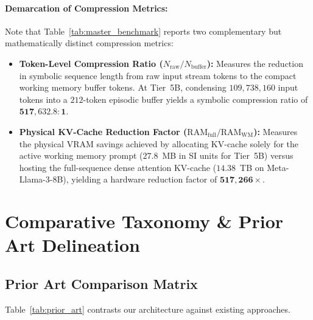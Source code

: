\documentclass[11pt,a4paper]{article}
\begin{document}
\paragraph{Demarcation of Compression Metrics:} Note that Table~\ref{tab:master_benchmark} reports two complementary but mathematically distinct compression metrics:
\begin{itemize}[leftmargin=*]
    \item \textbf{Token-Level Compression Ratio ($N_{\text{raw}} / N_{\text{buffer}}$):} Measures the reduction in symbolic sequence length from raw input stream tokens to the compact working memory buffer tokens. At Tier~5B, condensing $109,738,160$ input tokens into a $212$-token episodic buffer yields a symbolic compression ratio of $\mathbf{517,632.8 : 1}$.
    \item \textbf{Physical KV-Cache Reduction Factor ($\text{RAM}_{\text{full}} / \text{RAM}_{\text{WM}}$):} Measures the physical VRAM savings achieved by allocating KV-cache solely for the active working memory prompt ($27.8$~MB in SI units for Tier~5B) versus hosting the full-sequence dense attention KV-cache ($14.38$~TB on Meta-Llama-3-8B), yielding a hardware reduction factor of $\mathbf{517,266\times}$.
\end{itemize}

\section{Comparative Taxonomy \& Prior Art Delineation}

\subsection{Prior Art Comparison Matrix}
Table~\ref{tab:prior_art} contrasts our architecture against existing approaches.
\end{document}
